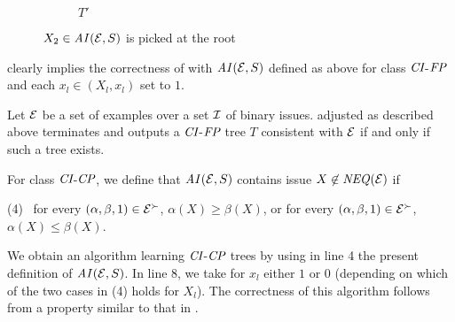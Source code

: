 \begin{figure}
\begin{subfigure}[b]{0.45\textwidth}
		\caption{$T'$ \label{fig:promote_T_updated}}
	\end{subfigure}
	\caption{$X_2 \in \mathit{AI}(\mathcal{E},S)$ is picked at the root \label{fig:promote}}
\end{figure}

 clearly implies the correctness of  with 
$\mathit{AI}(\mathcal{E},S)$ defined as above for class $\textit{CI}$-$\textit{FP}$ and each $x_l \in 
(X_l,x_l)$ set to $1$.

\begin{thm}
Let $\mathcal{E}$ be a set of examples over a set $\mathcal{I}$ of binary issues.
 adjusted as described above terminates and outputs
a $\textit{CI}$-$\textit{FP}$ tree $T$ consistent with $\mathcal{E}$ if
and only if such a tree exists.
\end{thm}


For class $\textit{CI}$-$\textit{CP}$, we define that $\mathit{AI}(\mathcal{E},S)$ contains issue $X \not \in \mathit{NEQ}(\mathcal{E})$ if 

\noindent (4) \ for every $(\alpha,\beta,1) \in \mathcal{E}^\succ$, $\alpha(X) \geq 
\beta(X)$, or for every $(\alpha,\beta,1) \in \mathcal{E}^\succ$, $\alpha(X) \leq \beta(X)$.

We obtain an algorithm learning $\textit{CI}$-$\textit{CP}$ trees by using in line 4
the present definition of $\mathit{AI}(\mathcal{E},S)$. In line 8, we take for 
$x_l$ either $1$ or $0$ (depending on which of the two
cases in (4) holds for $X_l$).
The correctness of this algorithm follows from a property similar to
that in .


